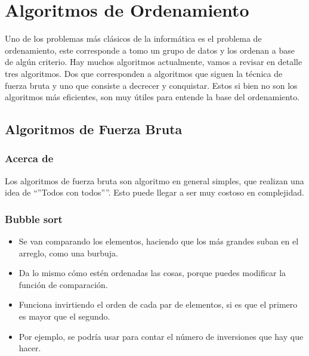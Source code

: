 \documentclass[letterpaper,10pt,spanish]{sphinxmanual}
\begin{document}
\chapter{Algoritmos de Ordenamiento}
\label{\detokenize{ordenamiento/ordenamiento:algoritmos-de-ordenamiento}}\label{\detokenize{ordenamiento/ordenamiento::doc}}
Uno de los problemas más clásicos de la informática es el problema de ordenamiento, este corresponde a tomo un grupo de datos y los ordenan a base de algún criterio. Hay muchos algoritmos actualmente, vamos a revisar en detalle tres algoritmos. Dos que corresponden a algoritmos que siguen la técnica de fuerza bruta y uno que consiste a decrecer y conquistar. Estos si bien no son los algoritmos más eficientes, son muy útiles para entende la base del ordenamiento.


\section{Algoritmos de Fuerza Bruta}
\label{\detokenize{ordenamiento/fuerza_bruta:algoritmos-de-fuerza-bruta}}\label{\detokenize{ordenamiento/fuerza_bruta::doc}}

\subsection{Acerca de}
\label{\detokenize{ordenamiento/fuerza_bruta:acerca-de}}
Los algoritmos de fuerza bruta son algoritmo en general simples, que realizan una idea de “”Todos con todos””. Esto puede llegar a ser muy costoso en complejidad.


\subsection{Bubble sort}
\label{\detokenize{ordenamiento/fuerza_bruta:bubble-sort}}\begin{itemize}
\item {} 
Se van comparando los elementos, haciendo que los más grandes suban en el arreglo, como una burbuja.

\item {} 
Da lo mismo cómo estén ordenadas las cosas, porque puedes modificar la función de comparación.

\item {} 
Funciona invirtiendo el orden de cada par de elementos, si es que el primero es mayor que el segundo.

\item {} 
Por ejemplo, se podría usar para contar el número de inversiones que hay que hacer.

\end{itemize}
\end{document}
